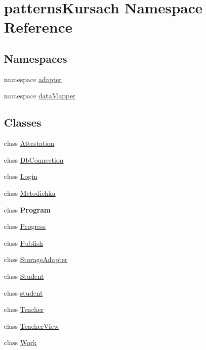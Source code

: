 \hypertarget{namespacepatterns_kursach}{}\section{patterns\+Kursach Namespace Reference}
\label{namespacepatterns_kursach}
\subsection*{Namespaces}
\begin{DoxyCompactItemize}
\item 
namespace \mbox{\hyperlink{namespacepatterns_kursach_1_1adapter}{adapter}}
\item 
namespace \mbox{\hyperlink{namespacepatterns_kursach_1_1data_mapper}{data\+Mapper}}
\end{DoxyCompactItemize}
\subsection*{Classes}
\begin{DoxyCompactItemize}
\item 
class \mbox{\hyperlink{classpatterns_kursach_1_1_attestation}{Attestation}}
\item 
class \mbox{\hyperlink{classpatterns_kursach_1_1_db_connection}{Db\+Connection}}
\item 
class \mbox{\hyperlink{classpatterns_kursach_1_1_login}{Login}}
\item 
class \mbox{\hyperlink{classpatterns_kursach_1_1_metodichka}{Metodichka}}
\item 
class {\bfseries Program}
\item 
class \mbox{\hyperlink{classpatterns_kursach_1_1_progress}{Progress}}
\item 
class \mbox{\hyperlink{classpatterns_kursach_1_1_publish}{Publish}}
\item 
class \mbox{\hyperlink{classpatterns_kursach_1_1_storage_adapter}{Storage\+Adapter}}
\item 
class \mbox{\hyperlink{classpatterns_kursach_1_1_student}{Student}}
\item 
class \mbox{\hyperlink{classpatterns_kursach_1_1student}{student}}
\item 
class \mbox{\hyperlink{classpatterns_kursach_1_1_teacher}{Teacher}}
\item 
class \mbox{\hyperlink{classpatterns_kursach_1_1_teacher_view}{Teacher\+View}}
\item 
class \mbox{\hyperlink{classpatterns_kursach_1_1_work}{Work}}
\end{DoxyCompactItemize}
